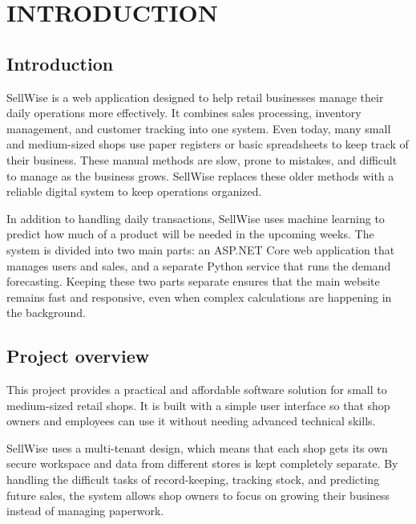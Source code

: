 \documentclass[12pt,a4paper]{report}
\begin{document}
\chapter{INTRODUCTION}
\section{Introduction}
SellWise is a web application designed to help retail businesses manage their daily operations more effectively. It combines sales processing, inventory management, and customer tracking into one system. Even today, many small and medium-sized shops use paper registers or basic spreadsheets to keep track of their business. These manual methods are slow, prone to mistakes, and difficult to manage as the business grows. SellWise replaces these older methods with a reliable digital system to keep operations organized.

In addition to handling daily transactions, SellWise uses machine learning to predict how much of a product will be needed in the upcoming weeks. The system is divided into two main parts: an ASP.NET Core web application that manages users and sales, and a separate Python service that runs the demand forecasting. Keeping these two parts separate ensures that the main website remains fast and responsive, even when complex calculations are happening in the background.

\section{Project overview}
This project provides a practical and affordable software solution for small to medium-sized retail shops. It is built with a simple user interface so that shop owners and employees can use it without needing advanced technical skills. 

SellWise uses a multi-tenant design, which means that each shop gets its own secure workspace and data from different stores is kept completely separate. By handling the difficult tasks of record-keeping, tracking stock, and predicting future sales, the system allows shop owners to focus on growing their business instead of managing paperwork.
\end{document}
